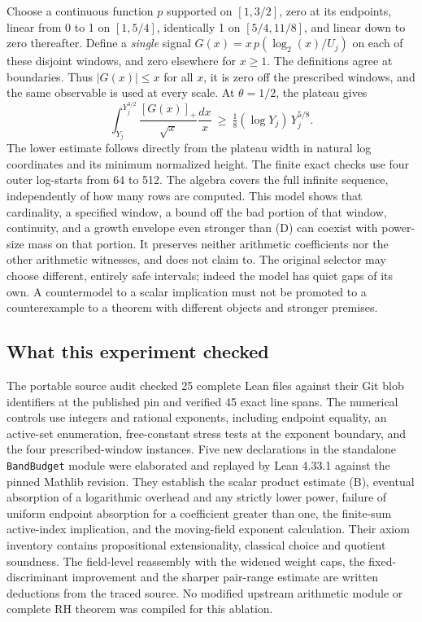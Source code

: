 \documentclass[12pt,letterpaper]{article}
\begin{document}
Choose a continuous function \(p\) supported on \([1,3/2]\), zero at its endpoints, linear from 0 to 1 on \([1,5/4]\), identically 1 on \([5/4,11/8]\), and linear down to zero thereafter. Define a \emph{single} signal \(G(x)=x\,p(\log_2(x)/U_j)\) on each of these disjoint windows, and zero elsewhere for \(x\ge1\). The definitions agree at boundaries. Thus \(|G(x)|\le x\) for all \(x\), it is zero off the prescribed windows, and the same observable is used at every scale. At \(\theta=1/2\), the plateau gives
\[
    \int_{Y_j}^{Y_j^{3/2}}\frac{[G(x)]_+}{\sqrt{x}}\frac{dx}{x}
                \ \ge\ \tfrac18(\log Y_j)\,Y_j^{5/8}.
\]
The lower estimate follows directly from the plateau width in natural log coordinates and its minimum normalized height. The finite exact checks use four outer log-starts from 64 to 512. The algebra covers the full infinite sequence, independently of how many rows are computed. This model shows that cardinality, a specified window, a bound off the bad portion of that window, continuity, and a growth envelope even stronger than (D) can coexist with power-size mass on that portion. It preserves neither arithmetic coefficients nor the other arithmetic witnesses, and does not claim to. The original selector may choose different, entirely safe intervals; indeed the model has quiet gaps of its own. A countermodel to a scalar implication must not be promoted to a counterexample to a theorem with different objects and stronger premises.

\subsection{What this experiment checked}
The portable source audit checked 25 complete Lean files against their Git blob identifiers at the published pin and verified 45 exact line spans. The numerical controls use integers and rational exponents, including endpoint equality, an active-set enumeration, free-constant stress tests at the exponent boundary, and the four prescribed-window instances. Five new declarations in the standalone \texttt{BandBudget} module were elaborated and replayed by Lean 4.33.1 against the pinned Mathlib revision. They establish the scalar product estimate (B), eventual absorption of a logarithmic overhead and any strictly lower power, failure of uniform endpoint absorption for a coefficient greater than one, the finite-sum active-index implication, and the moving-field exponent calculation. Their axiom inventory contains propositional extensionality, classical choice and quotient soundness. The field-level reassembly with the widened weight caps, the fixed-discriminant improvement and the sharper pair-range estimate are written deductions from the traced source. No modified upstream arithmetic module or complete RH theorem was compiled for this ablation.
\end{document}
